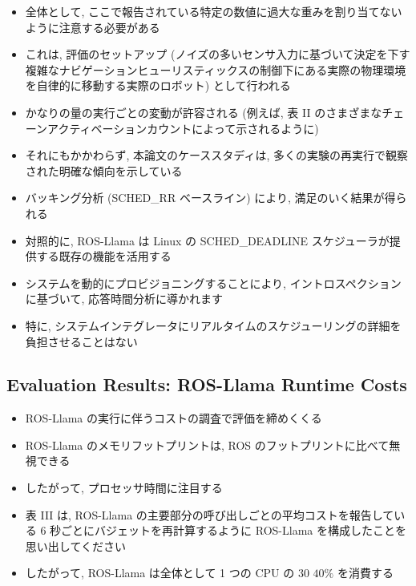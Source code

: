 \begin{frame}{}
    \begin{itemize}
        \item 全体として, ここで報告されている特定の数値に過大な重みを割り当てないように注意する必要がある
\item これは, 評価のセットアップ (ノイズの多いセンサ入力に基づいて決定を下す複雑なナビゲーションヒューリスティックスの制御下にある実際の物理環境を自律的に移動する実際のロボット) として行われる
\item かなりの量の実行ごとの変動が許容される (例えば, 表 II のさまざまなチェーンアクティベーションカウントによって示されるように)
    \end{itemize}
\end{frame}

\begin{frame}{}
    \begin{itemize}
        \item それにもかかわらず, 本論文のケーススタディは, 多くの実験の再実行で観察された明確な傾向を示している
\item バッキング分析 (SCHED\_RR ベースライン) により, 満足のいく結果が得られる
\item 対照的に, ROS-Llama は Linux の SCHED\_DEADLINE スケジューラが提供する既存の機能を活用する
\item システムを動的にプロビジョニングすることにより, イントロスペクションに基づいて, 応答時間分析に導かれます
\item 特に, システムインテグレータにリアルタイムのスケジューリングの詳細を負担させることはない
    \end{itemize}
\end{frame}


\subsection{Evaluation Results: ROS-Llama Runtime Costs}
\label{ssec: evaluation results: ros-llama runtime costs}

\begin{frame}{}
    \begin{itemize}
        \item ROS-Llama の実行に伴うコストの調査で評価を締めくくる
\item ROS-Llama のメモリフットプリントは, ROS のフットプリントに比べて無視できる
\item したがって, プロセッサ時間に注目する
\item 表 III は, ROS-Llama の主要部分の呼び出しごとの平均コストを報告している 6 秒ごとにバジェットを再計算するように ROS-Llama を構成したことを思い出してください
\item したがって, ROS-Llama は全体として 1 つの CPU の 30 $40 \%$ を消費する
    \end{itemize}
\end{frame}

